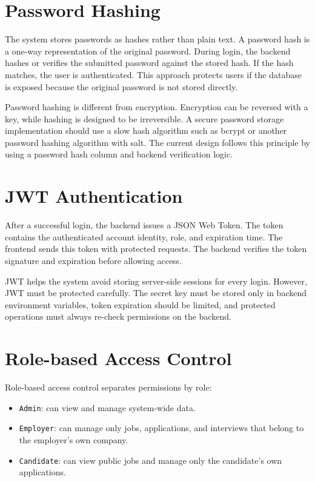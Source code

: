 \documentclass[12pt,a4paper]{report}
\begin{document}
\section{Password Hashing}

The system stores passwords as hashes rather than plain text. A password hash is a one-way representation of the original password. During login, the backend hashes or verifies the submitted password against the stored hash. If the hash matches, the user is authenticated. This approach protects users if the database is exposed because the original password is not stored directly.

Password hashing is different from encryption. Encryption can be reversed with a key, while hashing is designed to be irreversible. A secure password storage implementation should use a slow hash algorithm such as bcrypt or another password hashing algorithm with salt. The current design follows this principle by using a password hash column and backend verification logic.

\section{JWT Authentication}

After a successful login, the backend issues a JSON Web Token. The token contains the authenticated account identity, role, and expiration time. The frontend sends this token with protected requests. The backend verifies the token signature and expiration before allowing access.

JWT helps the system avoid storing server-side sessions for every login. However, JWT must be protected carefully. The secret key must be stored only in backend environment variables, token expiration should be limited, and protected operations must always re-check permissions on the backend.

\section{Role-based Access Control}

Role-based access control separates permissions by role:

\begin{itemize}[leftmargin=1.5cm]
  \item \texttt{Admin}: can view and manage system-wide data.
  \item \texttt{Employer}: can manage only jobs, applications, and interviews that belong to the employer's own company.
  \item \texttt{Candidate}: can view public jobs and manage only the candidate's own applications.
\end{itemize}
\end{document}
